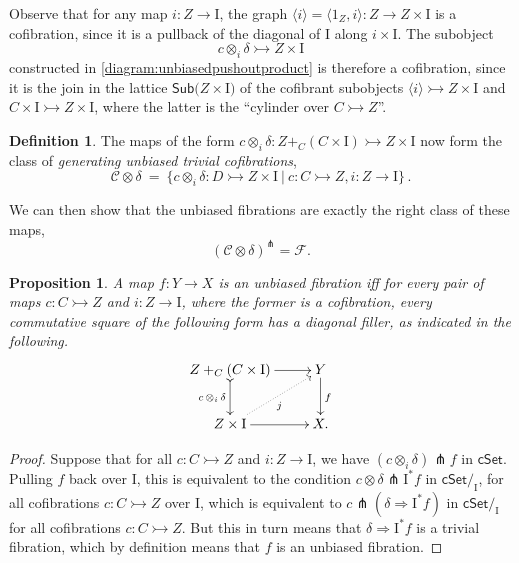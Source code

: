 \documentclass[11pt,reqno]{amsart}
\newcommand{\cSet}{\ensuremath{\mathsf{cSet}}}
\newcommand{\slice}[1]{\ensuremath{/_{\!{#1}}}}
\newcommand{\mono}{\ensuremath{\rightarrowtail}}
\newcommand{\ra}{\ensuremath{\rightarrow}}
\renewcommand{\to}{\ensuremath{\rightarrow}}
\newcommand{\gph}[1]{\ensuremath{\langle #1 \rangle}}
\newcommand{\Sub}[1]{\ensuremath{\mathsf{Sub}{#1}}}
\newcommand{\I}{\ensuremath{\mathrm{I}}}
\newtheorem{proposition}[theorem]{Proposition}
\theoremstyle{remark}
\theoremstyle{definition}
\newtheorem{definition}[theorem]{Definition}
\begin{document}
Observe that for any map $i : Z\to \I$, the graph $\gph{i} = \langle 1_Z, i \rangle : Z \to Z\times \I$ is a cofibration, since it is a pullback of the diagonal of $\I$ along $i\times \I$.  The subobject 
\[
c \otimes_i\!\delta \mono Z\times \I
\]
 constructed in \eqref{diagram:unbiasedpushoutproduct} is therefore a cofibration, since it is the join in the lattice $\Sub(Z\times \I)$ of the cofibrant subobjects $\gph{i} \mono Z\times \I$ and $C\times \I \mono Z\times \I$, where the latter is the ``cylinder over $C\mono Z$''.

\begin{definition}\label{def:genunbiasedtrivcof}
The maps of the form $c\otimes_i\delta : Z +_C (C\times\I) \mono Z\times\I$  now form the class of \emph{generating unbiased trivial cofibrations},
\begin{equation}\label{eq:generatingtrivialcofibrations}
\mathcal{C}\otimes\delta\ =\ \{ c \otimes_i \delta : D \mono Z \times \I\ |\ c : C\mono Z, i:Z\ra\I \}\,.
\end{equation}
\end{definition}

We can then show that the unbiased fibrations are exactly the right class of these maps,
\[
(\mathcal{C}\otimes\delta)^{\pitchfork} = \mathcal{F}.
\]
\begin{proposition}\label{prop:fibiffrlp}
A map $f: Y\ra X$ is an unbiased fibration iff for every pair of maps $c : C\mono Z$ and $i:Z\ra\I$, where the former is a cofibration, every commutative square of the following form has a diagonal filler, as indicated in the following.
\begin{equation}\label{diagram:unbiasedfibration}
\xymatrix{
Z +_C (C\times\I) \ar@{>->}[d]_{c\, \otimes_i\, \delta} \ar[r] & Y \ar[d]^f \\
Z\times \I \ar@{.>}[ru]_{j} \ar[r] & X.
}
\end{equation}
\end{proposition}

\begin{proof}
Suppose that for all $c : C\mono Z$ and $i:Z\ra\I$, we have $(c\otimes_i\delta) \pitchfork f$ in $\cSet$. Pulling $f$ back over $\I$, this is equivalent to the condition $c\otimes\delta \pitchfork \I^*f$ in $\cSet\slice{\I}$, for all cofibrations $c : C\mono Z$ over $\I$, which is equivalent to $c\pitchfork(\delta\Rightarrow \I^*f)$ in $\cSet\slice{\I}$ for all cofibrations $c : C\mono Z$.  But this in turn means that $\delta\Rightarrow\I^*f$ is a trivial fibration, which by definition means that $f$ is an unbiased fibration.
\end{proof}
\end{document}
